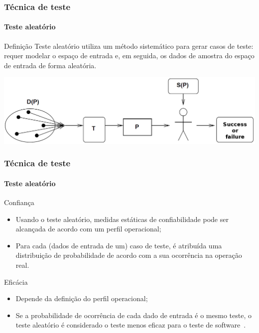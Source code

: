 \begin{frame}
\frametitle{Técnica de teste}
\framesubtitle{Teste aleatório}
\label{concept:random-testing}

\begin{block:concept}{Definição}
Teste aleatório utiliza um método sistemático para gerar casos de teste: requer modelar o espaço de entrada e, em seguida, os dados de amostra do espaço de entrada de forma aleatória.
\end{block:concept}

\begin{block:fact}{}
    \centering
    \includegraphics[width=\textwidth]{teste-de-software/conceitos-basicos/Imagens/random-software-testing}
\end{block:fact}
\end{frame}


\begin{frame}
\frametitle{Técnica de teste}
\framesubtitle{Teste aleatório}

\begin{block:concept}{Confiança}
\begin{itemize}
	\item Usando o teste aleatório, medidas estáticas de confiabilidade pode ser alcançada de acordo com um perfil operacional;

	\item Para cada (dados de entrada de um) caso de teste, é atribuída uma distribuição de probabilidade de acordo com a sua ocorrência na operação real.
\end{itemize}
\end{block:concept}

\begin{block:fact}{Eficácia}
\begin{itemize}
	\item Depende da definição do perfil operacional;

	\item Se a probabilidade de ocorrência de cada dado de entrada é o mesmo teste, o teste aleatório é considerado o teste menos eficaz para o teste de software~\cite[p. 43]{myers:2004}.
\end{itemize}

\end{block:fact}


\end{frame}


